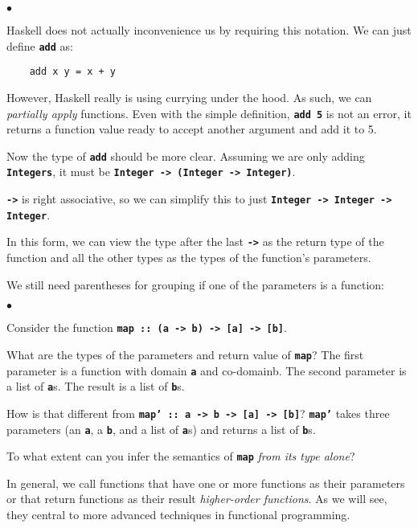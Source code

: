 \documentclass[12pt]{article}
\newcommand\code[1]{\texttt{\textbf{#1}}}
\newenvironment{notelist}{\begin{list}
   {$\bullet$}
   {\setlength{\itemsep}{0in}}}
   {\end{list}}
\begin{document}
\begin{notelist}
    \item Haskell does not actually inconvenience us by requiring this notation. We can just define \code{add} as:
    \begin{lstlisting} 
    add x y = x + y
    \end{lstlisting} 

    \item However, Haskell really is using currying under the hood. As such, we can \textit{partially apply}
          functions. Even with the simple definition, \code{add 5} is not an error, it returns a function value
          ready to accept another argument and add it to 5.

    \item Now the type of \code{add} should be more clear. Assuming we are only adding \code{Integers}, it must
          be \code{Integer -> (Integer -> Integer)}. 

    \item \code{->} is right associative, so we can simplify this to just \code{Integer -> Integer -> Integer}.

    \item In this form, we can view the type after the last \code{->} as the return type of the function and
          all the other types as the types of the function's parameters.

    \item We still need parentheses for grouping if one of the parameters is a function:
    \begin{notelist}
        \item Consider the function \code{map :: (a -> b) -> [a] -> [b]}.
        \item What are the types of the parameters and return value of \code{map}? The first parameter is a function
              with domain \code{a} and co-domain{b}. The second parameter is a list of \code{a}s. The result
              is a list of \code{b}s.
        \item How is that different from \code{map' :: a -> b -> [a] -> [b]}? \code{map'} takes three parameters
              (an \code{a}, a \code{b}, and a list of \code{a}s) and returns a list of \code{b}s.
        \item To what extent can you infer the semantics of \code{map} \textit{from its type alone}?
    \end{notelist}
    
    \item In general, we call functions that have one or more functions as their parameters or that return functions
          as their result \textit{higher-order functions}. As we will see, they central to more advanced techniques
          in functional programming.
\end{notelist}
\end{document}
